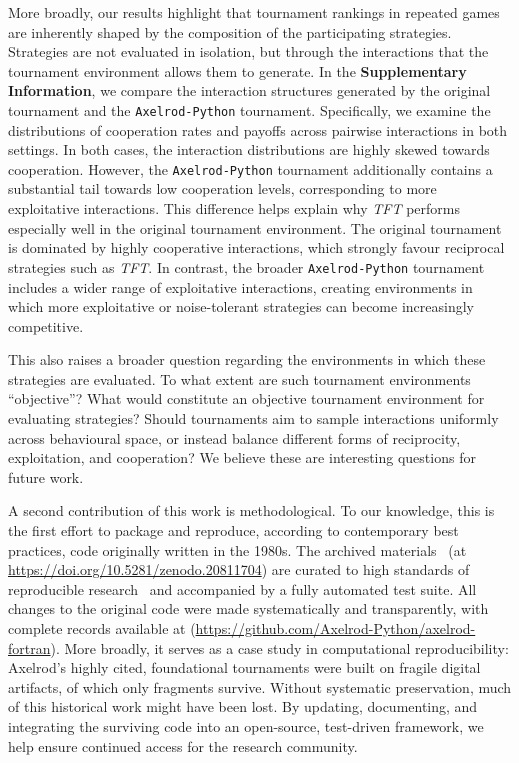 \documentclass{article}
\newcommand{\TFT}{\emph{TFT}}
\newcommand{\AXL}{\texttt{Axelrod-Python}}
\newcommand{\SI}{\textbf{Supplementary Information}}
\begin{document}
More broadly, our results highlight that tournament rankings in repeated games
are inherently shaped by the composition of the participating strategies.
Strategies are not evaluated in isolation, but through the interactions that
the tournament environment allows them to generate.
In the \SI{}, we compare the interaction structures generated by the original
tournament and the \AXL{} tournament. Specifically, we examine the
distributions of cooperation rates and payoffs across pairwise interactions in
both settings. In both cases, the interaction distributions are highly skewed
towards cooperation. However, the \AXL{} tournament additionally contains a
substantial tail towards low cooperation levels, corresponding to more
exploitative interactions.
This difference helps explain why \TFT{} performs especially well in the
original tournament environment. The original tournament is dominated by highly
cooperative interactions, which strongly favour reciprocal strategies such as
\TFT{}. In contrast, the broader \AXL{} tournament includes a wider range of
exploitative interactions, creating environments in which more exploitative or
noise-tolerant strategies can become increasingly competitive.

This also raises a broader question regarding the environments in which these
strategies are evaluated. To what extent are such tournament environments
``objective''? What would constitute an objective tournament environment for
evaluating strategies? Should tournaments aim to sample interactions uniformly
across behavioural space, or instead balance different forms of reciprocity,
exploitation, and cooperation? We believe these are interesting questions for
future work.

A second contribution of this work is methodological. To our knowledge, this is
the first effort to package and reproduce, according to contemporary best
practices, code originally written in the 1980s. The archived materials~\cite{knight_2025_20811704} (at
\url{https://doi.org/10.5281/zenodo.20811704})
are curated to high standards of reproducible research~\cite{wilson2014, sandve2013, wilson2017, stodden2018, turingway2022} and
accompanied by a fully automated test suite. All changes to the original code
were made systematically and transparently, with complete records available at
(\url{https://github.com/Axelrod-Python/axelrod-fortran}).
More broadly, it serves as a case study in computational reproducibility: Axelrod's highly cited,
foundational tournaments were built on fragile digital artifacts, of which only
fragments survive. Without systematic preservation, much of this
historical work might have been lost. By updating, documenting, and integrating the
surviving code into an open-source, test-driven framework, we help ensure
continued access for the research community.
\end{document}
